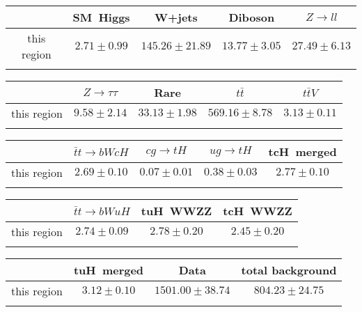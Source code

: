 \centering
\begin{tabular}{ccccc} \toprule\toprule
 & SM~Higgs & W+jets & Diboson & $Z\to ll$\\\midrule
this region & $2.71\pm0.99$ & $145.26\pm21.89$ & $13.77\pm3.05$ & $27.49\pm6.13$\\
\bottomrule\bottomrule\\
\end{tabular}
\begin{tabular}{ccccc} \toprule\toprule
 & $Z\to \tau\tau$ & Rare & $t\bar{t}$ & $t\bar{t}V$\\\midrule
this region & $9.58\pm2.14$ & $33.13\pm1.98$ & $569.16\pm8.78$ & $3.13\pm0.11$\\
\bottomrule\bottomrule\\
\end{tabular}
\begin{tabular}{ccccc} \toprule\toprule
 & $\bar{t}t\to bWcH$ & $cg\to tH$ & $ug\to tH$ & tcH~merged\\\midrule
this region & $2.69\pm0.10$ & $0.07\pm0.01$ & $0.38\pm0.03$ & $2.77\pm0.10$\\
\bottomrule\bottomrule\\
\end{tabular}
\begin{tabular}{cccc} \toprule\toprule
 & $\bar{t}t\to bWuH$ & tuH~WWZZ & tcH~WWZZ\\\midrule
this region & $2.74\pm0.09$ & $2.78\pm0.20$ & $2.45\pm0.20$\\
\bottomrule\bottomrule\\
\end{tabular}
\begin{tabular}{cccc} \toprule\toprule
 & tuH~merged & Data & total background\\\midrule
this region & $3.12\pm0.10$ & $1501.00\pm38.74$ & $804.23\pm24.75$\\
\bottomrule\bottomrule\\
\end{tabular}
